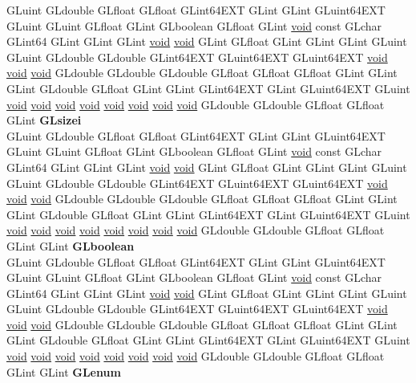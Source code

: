 \begin{DoxyCompactItemize}
\begin{tabbing}
\>GLuint GLdouble GLfloat GLfloat GLint64EXT GLint GLint GLuint64EXT GLuint GLuint GLfloat GLint GLboolean GLfloat GLint \hyperlink{interfacevoid}{void} const GLchar GLint64 GLint GLint GLint \hyperlink{interfacevoid}{void} \hyperlink{interfacevoid}{void} GLint GLfloat GLint GLint GLint GLuint GLuint GLdouble GLdouble GLint64EXT GLuint64EXT GLuint64EXT \hyperlink{interfacevoid}{void} \hyperlink{interfacevoid}{void} \hyperlink{interfacevoid}{void} GLdouble GLdouble GLdouble GLfloat GLfloat GLfloat GLint GLint GLint GLdouble GLfloat GLint GLint GLint64EXT GLint GLuint64EXT GLuint \hyperlink{interfacevoid}{void} \hyperlink{interfacevoid}{void} \hyperlink{interfacevoid}{void} \hyperlink{interfacevoid}{void} \hyperlink{interfacevoid}{void} \hyperlink{interfacevoid}{void} \hyperlink{interfacevoid}{void} \hyperlink{interfacevoid}{void} GLdouble GLdouble GLfloat GLfloat GLint {\bfseries GLsizei}\\
\>GLuint GLdouble GLfloat GLfloat GLint64EXT GLint GLint GLuint64EXT GLuint GLuint GLfloat GLint GLboolean GLfloat GLint \hyperlink{interfacevoid}{void} const GLchar GLint64 GLint GLint GLint \hyperlink{interfacevoid}{void} \hyperlink{interfacevoid}{void} GLint GLfloat GLint GLint GLint GLuint GLuint GLdouble GLdouble GLint64EXT GLuint64EXT GLuint64EXT \hyperlink{interfacevoid}{void} \hyperlink{interfacevoid}{void} \hyperlink{interfacevoid}{void} GLdouble GLdouble GLdouble GLfloat GLfloat GLfloat GLint GLint GLint GLdouble GLfloat GLint GLint GLint64EXT GLint GLuint64EXT GLuint \hyperlink{interfacevoid}{void} \hyperlink{interfacevoid}{void} \hyperlink{interfacevoid}{void} \hyperlink{interfacevoid}{void} \hyperlink{interfacevoid}{void} \hyperlink{interfacevoid}{void} \hyperlink{interfacevoid}{void} \hyperlink{interfacevoid}{void} GLdouble GLdouble GLfloat GLfloat GLint GLint {\bfseries GLboolean}\\
\>GLuint GLdouble GLfloat GLfloat GLint64EXT GLint GLint GLuint64EXT GLuint GLuint GLfloat GLint GLboolean GLfloat GLint \hyperlink{interfacevoid}{void} const GLchar GLint64 GLint GLint GLint \hyperlink{interfacevoid}{void} \hyperlink{interfacevoid}{void} GLint GLfloat GLint GLint GLint GLuint GLuint GLdouble GLdouble GLint64EXT GLuint64EXT GLuint64EXT \hyperlink{interfacevoid}{void} \hyperlink{interfacevoid}{void} \hyperlink{interfacevoid}{void} GLdouble GLdouble GLdouble GLfloat GLfloat GLfloat GLint GLint GLint GLdouble GLfloat GLint GLint GLint64EXT GLint GLuint64EXT GLuint \hyperlink{interfacevoid}{void} \hyperlink{interfacevoid}{void} \hyperlink{interfacevoid}{void} \hyperlink{interfacevoid}{void} \hyperlink{interfacevoid}{void} \hyperlink{interfacevoid}{void} \hyperlink{interfacevoid}{void} \hyperlink{interfacevoid}{void} GLdouble GLdouble GLfloat GLfloat GLint GLint {\bfseries GLenum}\\

\end{tabbing}
\end{DoxyCompactItemize}
